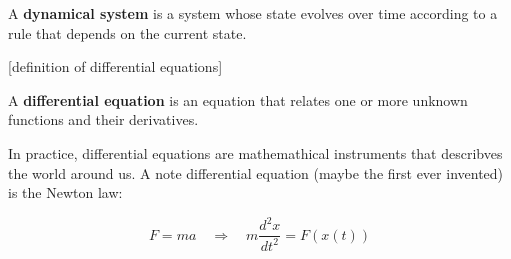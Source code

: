 \begin{definitionblock}
A \textbf{dynamical system} is a system whose state evolves over time according to a rule that depends on the current state.
\end{definitionblock}

[definition of differential equations]

\begin{definitionblock}
    A \textbf{differential equation} is an equation that relates one or more unknown functions and their derivatives.
\end{definitionblock}

In practice, differential equations are mathemathical instruments that describves the world around us. A note differential equation (maybe the first ever invented) is the Newton law:

$$
F = ma \quad \Rightarrow \quad m \frac{d^2x}{dt^2} = F(x(t))
$$

\cleardoublepage